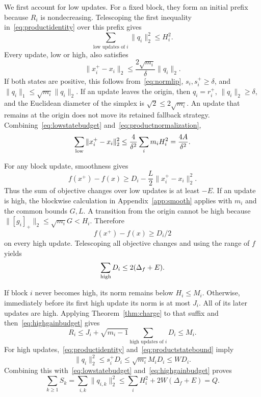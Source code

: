 \documentclass{article}
\begin{document}
We first account for low updates. For a fixed block, they form an initial prefix because $R_i$ is nondecreasing. Telescoping the first inequality in~\eqref{eq:productidentity} over this prefix gives
\begin{equation}
\sum_{\text{low updates of }i}\|q_i\|_2^2\le H_i^2.
\label{eq:lowstatebudget}
\end{equation}
Every update, low or high, also satisfies
\begin{equation}
\|x_i^+-x_i\|_2\le\frac{2\sqrt{m_i}}{\delta}\|q_i\|_2.
\label{eq:productnormalization}
\end{equation}
If both states are positive, this follows from~\eqref{eq:normlip}, $s_i,s_i^+\ge\delta$, and $\|q_i\|_1\le\sqrt{m_i}\|q_i\|_2$. If an update leaves the origin, then $q_i=r_i^+$, $\|q_i\|_2\ge\delta$, and the Euclidean diameter of the simplex is $\sqrt2\le2\sqrt{m_i}$. An update that remains at the origin does not move its retained fallback strategy. Combining~\eqref{eq:lowstatebudget} and~\eqref{eq:productnormalization},
\begin{equation}
\sum_{\rm low}\|x_i^+-x_i\|_2^2
\le\frac{4}{\delta^2}\sum_i m_iH_i^2=\frac{4A}{\delta^2}.
\label{eq:lowstrategybudget}
\end{equation}

For any block update, smoothness gives
\begin{equation}
f(x^+)-f(x)\ge D_i-\frac L2\|x_i^+-x_i\|_2^2.
\label{eq:blocksmooth}
\end{equation}
Thus the sum of objective changes over low updates is at least $-E$. If an update is high, the blockwise calculation in Appendix~\ref{app:smooth} applies with $m_i$ and the common bounds $G,L$. A transition from the origin cannot be high because $\|[g_i]_+\|_2\le\sqrt{m_i}G<H_i$. Therefore
\begin{equation}
f(x^+)-f(x)\ge D_i/2
\label{eq:producthighascent}
\end{equation}
on every high update. Telescoping all objective changes and using the range of $f$ yields
\begin{equation}
\sum_{\rm high}D_i\le2(\Delta_f+E).
\label{eq:highgainbudget}
\end{equation}

If block $i$ never becomes high, its norm remains below $H_i\le M_i$. Otherwise, immediately before its first high update its norm is at most $J_i$. All of its later updates are high. Applying Theorem~\ref{thm:charge} to that suffix and then~\eqref{eq:highgainbudget} gives
\begin{equation}
R_i\le J_i+\sqrt{m_i-1}\sum_{\text{high updates of }i}D_i\le M_i.
\label{eq:productstatebound}
\end{equation}
For high updates,~\eqref{eq:productidentity} and~\eqref{eq:productstatebound} imply
\begin{equation}
\|q_i\|_2^2\le s_i^+D_i\le\sqrt{m_i}M_iD_i\le WD_i.
\end{equation}
Combining this with~\eqref{eq:lowstatebudget} and~\eqref{eq:highgainbudget} proves
\begin{equation}
\sum_{k\ge1}S_k=\sum_{i,k}\|q_{i,k}\|_2^2
\le\sum_iH_i^2+2W(\Delta_f+E)=Q.
\label{eq:productsquarepath}
\end{equation}
\end{document}
